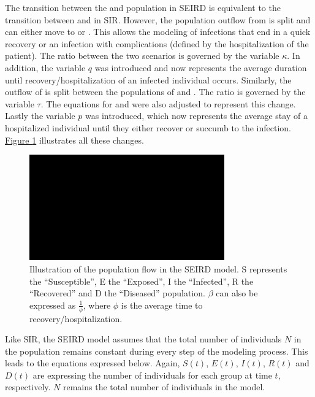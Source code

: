 The transition between the  and  population in SEIRD is equivalent to the transition
between  and  in SIR. However, the population outflow from  is split and can either move
to  or . This allows the modeling of infections that end in a quick recovery or an infection
with complications (defined by the hospitalization of the patient). The ratio between the two scenarios is governed by the variable
$\kappa$. In addition, the variable $q$ was introduced and now represents the average duration until recovery/hospitalization of an
infected individual occurs. Similarly, the outflow of  is split between the populations of  and . The ratio is governed
by the variable $\tau$. The equations for  and  were also adjusted to represent this change. Lastly the variable $p$ was
introduced, which now represents the average stay of a hospitalized individual until they either recover or succumb to the infection.
\hyperref[fig:SEIRD]{Figure \ref*{fig:SEIRD}} illustrates all these changes.\\

\begin{figure}
	\begin{center}
		\includegraphics[width=0.75\textwidth]{./figures/SEIRD.png}
		\caption{Illustration of the population flow in the SEIRD model. S represents the ``Susceptible'', E the ``Exposed'',
			I the ``Infected'', R the ``Recovered'' and D the ``Diseased'' population. $\beta$ can also be expressed as
			$\frac{1}{\phi}$, where $\phi$ is the average time to recovery/hospitalization.}
		\label{fig:SEIRD}
	\end{center}
\end{figure}



Like SIR, the SEIRD model assumes that the total number of individuals $N$ in the population remains constant during every step
of the modeling process. This leads to the equations expressed below. Again, $S(t)$, $E(t)$, $I(t)$, $R(t)$ and $D(t)$ are
expressing the number of individuals for each group at time $t$, respectively. $N$ remains the total number of individuals in the model.

